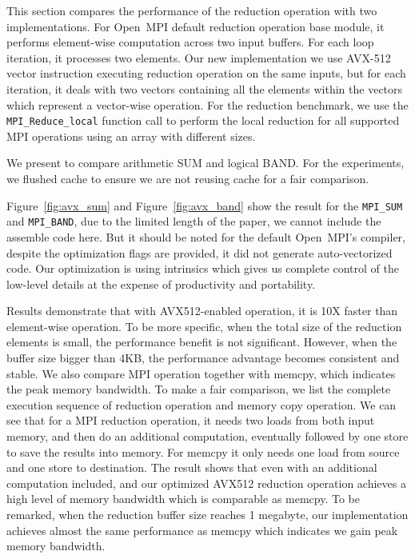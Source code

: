 \documentclass[sigconf]{acmart}
\newcommand{\mpifunc}[1]{\lstinline"MPI_#1"\xspace}
\newcommand{\ompi}[0]{Open~MPI\xspace}
\newcommand{\mpi}[0]{\textsc{MPI}\xspace}
\begin{document}
This section compares the performance of the reduction operation with two
implementations.
For \ompi default reduction operation base module, it
performs element-wise computation across two input buffers. For each loop iteration,
it processes two elements. Our new implementation we use AVX-512 vector instruction
executing reduction operation on the same inputs, but for each iteration, it
deals with two vectors containing all the elements within the vectors which represent
a vector-wise operation.
For the reduction benchmark, we use the \mpifunc{Reduce_local} function call to
perform the local reduction for all supported MPI operations using an array with different sizes.

We present to compare arithmetic SUM and logical BAND.
For the experiments, we flushed cache to ensure we are not reusing cache for a fair comparison.

Figure~\ref{fig:avx_sum} and Figure~\ref{fig:avx_band} show the result for the
\mpifunc{SUM} and \mpifunc{BAND}, due to the limited length of the paper, we cannot
include the assemble code here. But it should be noted for the default \ompi's compiler, despite
the optimization flags are provided, it did not generate auto-vectorized code. Our optimization is
using intrinsics which gives us complete control of the low-level details
at the expense of productivity and portability.

Results demonstrate that with AVX512-enabled operation, it is 10X faster than element-wise operation.
To be more specific, when the total size of the reduction elements is small, the performance benefit is
not significant. However, when the buffer size bigger than 4KB, the performance advantage becomes consistent and stable.
We also compare MPI operation together with memcpy, which indicates the peak memory bandwidth.
To make a fair comparison, we list the complete execution sequence of reduction operation and memory copy operation.
We can see that for a \mpi reduction operation, it needs two loads from both input memory, and then do an additional computation, eventually followed by one store to save the results into memory. For memcpy it only needs one load from source and one store to destination.
The result shows that even with an additional computation included, and our optimized AVX512 reduction operation achieves
a high level of memory bandwidth which is comparable as memcpy.
To be remarked, when the reduction buffer size reaches 1 megabyte,
our implementation achieves almost the same performance as memcpy which indicates
we gain peak memory bandwidth.
\end{document}
